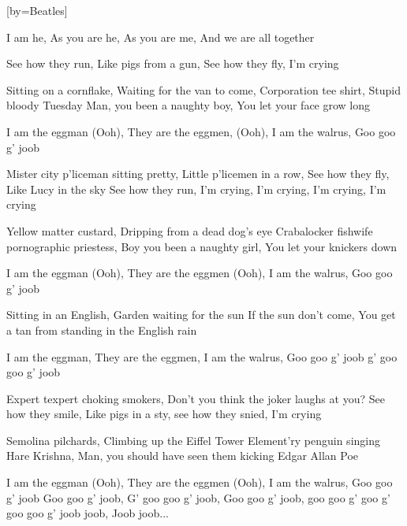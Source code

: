 

[by=Beatles]


\beginverse
I am he, As you are he, As you are me, And we are all together

See how they run, Like pigs from a gun, See how they fly, I'm crying

Sitting on a cornflake, Waiting for the van to come, Corporation tee shirt, Stupid bloody Tuesday
Man, you been a naughty boy, You let your face grow long

I am the eggman (Ooh), They are the eggmen, (Ooh), I am the walrus, Goo goo g' joob
\endverse

\beginverse
Mister city p'liceman sitting pretty, Little p'licemen in a row, See how they fly, Like Lucy in the sky
See how they run, I'm crying, I'm crying, I'm crying, I'm crying

Yellow matter custard, Dripping from a dead dog's eye
Crabalocker fishwife pornographic priestess, Boy you been a naughty girl, You let your knickers down

I am the eggman (Ooh), They are the eggmen (Ooh), I am the walrus, Goo goo g' joob
\endverse

\beginverse
Sitting in an English, Garden waiting for the sun
If the sun don't come, You get a tan from standing in the English rain

I am the eggman, They are the eggmen, I am the walrus, Goo goo g' joob g' goo goo g' joob

Expert texpert choking smokers, Don't you think the joker laughs at you?
See how they smile, Like pigs in a sty, see how they snied, I'm crying

Semolina pilchards, Climbing up the Eiffel Tower
Element'ry penguin singing Hare Krishna, Man, you should have seen them kicking Edgar Allan Poe

I am the eggman (Ooh), They are the eggmen (Ooh), I am the walrus, Goo goo g' joob
Goo goo g' joob, G' goo goo g' joob, Goo goo g' joob, goo goo g' goo g' goo goo g' joob joob, Joob joob...
\endverse



\chordson
\endsong
